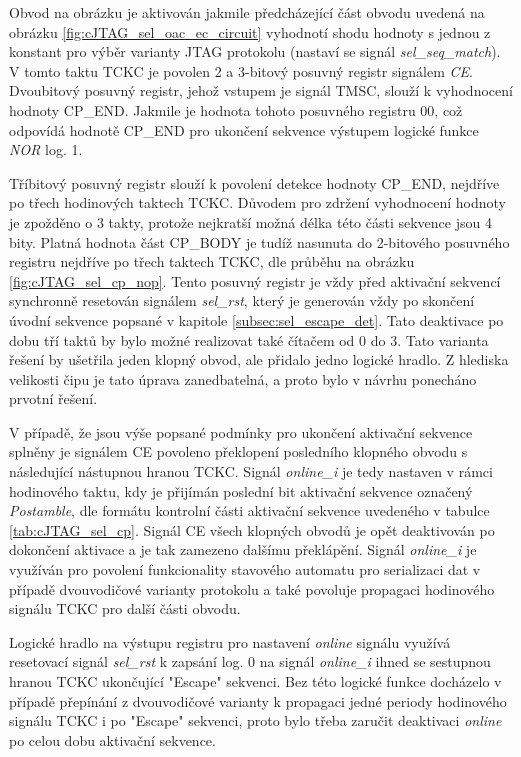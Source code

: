 Obvod na obrázku je aktivován jakmile předcházející část obvodu uvedená na obrázku \ref{fig:cJTAG_sel_oac_ec_circuit} vyhodnotí shodu hodnoty s jednou z konstant pro výběr varianty \acs{JTAG} protokolu (nastaví se signál \textit{sel\_seq\_match}). V tomto taktu TCKC je povolen 2 a 3-bitový posuvný registr signálem \textit{CE}. Dvoubitový posuvný registr, jehož vstupem je signál TMSC, slouží k vyhodnocení hodnoty CP\_END. Jakmile je hodnota tohoto posuvného registru 00, což odpovídá hodnotě CP\_END pro ukončení sekvence výstupem logické funkce \textit{NOR} log. 1.

Tříbitový posuvný registr slouží k povolení detekce hodnoty CP\_END, nejdříve po třech hodinových taktech TCKC. Důvodem pro zdržení vyhodnocení hodnoty je zpožděno o 3 takty, protože nejkratší možná délka této části sekvence jsou 4 bity. Platná hodnota část CP\_BODY je tudíž nasunuta do 2-bitového posuvného registru nejdříve po třech taktech TCKC, dle průběhu na obrázku \ref{fig:cJTAG_sel_cp_nop}. Tento posuvný registr je vždy před aktivační sekvencí synchronně resetován signálem \textit{sel\_rst}, který je generován vždy po skončení úvodní sekvence popsané v kapitole \ref{subsec:sel_escape_det}. Tato deaktivace po dobu tří taktů by bylo možné realizovat také čítačem od 0 do 3. Tato varianta řešení by ušetřila jeden klopný obvod, ale přidalo jedno logické hradlo. Z hlediska velikosti čipu je tato úprava zanedbatelná, a proto bylo v návrhu ponecháno prvotní řešení.

V případě, že jsou výše popsané podmínky pro ukončení aktivační sekvence splněny je signálem CE povoleno překlopení posledního klopného obvodu s následující nástupnou hranou TCKC. Signál \textit{online\_i} je tedy nastaven v rámci hodinového taktu, kdy je přijímán poslední bit aktivační sekvence označený \textit{Postamble}, dle formátu kontrolní části aktivační sekvence uvedeného v tabulce \ref{tab:cJTAG_sel_cp}. Signál CE všech klopných obvodů je opět deaktivován po dokončení aktivace a je tak zamezeno dalšímu překlápění. Signál \textit{online\_i} je využíván pro povolení funkcionality stavového automatu pro serializaci dat v případě dvouvodičové varianty protokolu a také povoluje propagaci hodinového signálu TCKC pro další části obvodu. 

Logické hradlo na výstupu registru pro nastavení \textit{online} signálu využívá resetovací signál \textit{sel\_rst} k zapsání log. 0 na signál \textit{online\_i} ihned se sestupnou hranou TCKC ukončující "Escape" sekvenci. Bez této logické funkce docházelo v případě přepínání z dvouvodičové varianty k propagaci jedné periody hodinového signálu TCKC i po "Escape" sekvenci, proto bylo třeba zaručit deaktivaci \textit{online} po celou dobu aktivační sekvence.

